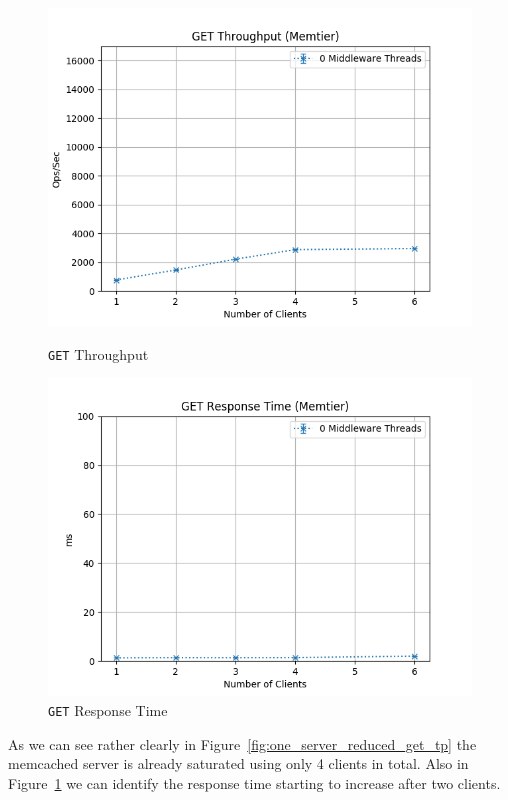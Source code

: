 \documentclass[11pt,a4paper]{article}
\begin{document}
\begin{figure}[H]
    \centering
    \captionsetup{width=0.4\textwidth}
    \begin{minipage}{0.5\textwidth}
        \centering
        \includegraphics[width=\textwidth]{../illustrations/plots/1_1_1_one_server_reduced/0-1/memtier_get_tp_s.png}
        \caption{\texttt{GET} Throughput}
        \label{fig:one_server_reduced_get_tp}
    \end{minipage}\hfill
    \begin{minipage}{0.5\textwidth}
        \centering
        \includegraphics[width=\textwidth]{../illustrations/plots/1_1_1_one_server_reduced/0-1/memtier_get_rt_ms.png}
        \caption{\texttt{GET} Response Time}
        \label{fig:one_server_reduced_get_rt}
    \end{minipage}
\end{figure}
%
As we can see rather clearly in Figure~\ref{fig:one_server_reduced_get_tp} the memcached server is already saturated using only 4 clients in total.
%
Also in Figure~\ref{fig:one_server_reduced_get_rt} we can identify the response time starting to increase after two clients.
%
\end{document}
